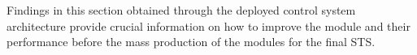 Findings in this section obtained through the deployed control system architecture provide crucial information on how to improve the module and their performance before the mass production of the modules for the final \gls{STS}. 



\newpage